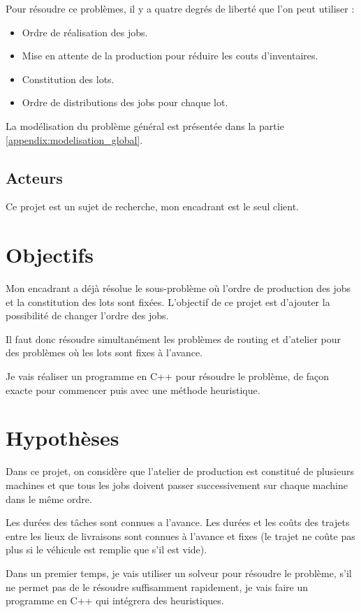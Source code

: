 Pour résoudre ce problèmes, il y a quatre degrés de liberté que l'on peut utiliser :
\begin{itemize}
    \item Ordre de réalisation des jobs.
    \item Mise en attente de la production pour réduire les couts d'inventaires.
    \item Constitution des lots.
    \item Ordre de distributions des jobs pour chaque lot.
\end{itemize}

La modélisation du problème général est présentée dans la partie \autoref{appendix:modelisation_global}.

\subsection{Acteurs}
Ce projet est un sujet de recherche, mon encadrant est le seul client.

\section{Objectifs}
Mon encadrant a déjà résolue le sous-problème où l'ordre de production des jobs et la constitution des lots sont fixées.
L'objectif de ce projet est d'ajouter la possibilité de changer l'ordre des jobs.

Il faut donc résoudre simultanément les problèmes de routing et d'atelier pour des problèmes où les lots sont fixes à l'avance.

Je vais réaliser un programme en C++ pour résoudre le problème,
de façon exacte pour commencer puis avec une méthode heuristique.

\section{Hypothèses}
Dans ce projet, on considère que l'atelier de production est constitué de plusieurs machines 
    et que tous les jobs doivent passer successivement sur chaque machine dans le même ordre.

Les durées des tâches sont connues a l'avance.
Les durées et les coûts des trajets entre les lieux de livraisons sont connues à l'avance 
    et fixes (le trajet ne coûte pas plus si le véhicule est remplie que s'il est vide).

Dans un premier temps, je vais utiliser un solveur pour résoudre le problème, 
    s'il ne permet pas de le résoudre suffisamment rapidement, 
    je vais faire un programme en C++ qui intégrera des heuristiques.

